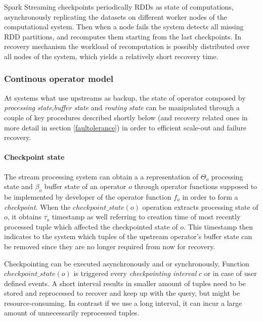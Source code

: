 Spark Streaming checkpoints periodically RDDs as state of computations, asynchronously replicating the datasets on different worker nodes of the computational system. Then when a node fails the system detects all missing RDD partitions, and recomputes them starting from the last checkpoints. In recovery mechanism the workload of recomputation is possibly distributed over all nodes of the system, which yields a relatively short recovery time.


\subsubsection{Continous operator model} %



At systems what use upstreams as backup, the state of operator composed by \textit{processing state},\textit{buffer state} and \textit{routing state} can be manipulated through a couple of key procedures described shortly below (and recovery related ones in more detail in section \ref{faultolerance}) in order to efficient scale-out and failure recovery.


\paragraph{Checkpoint state} 
The stream processing system can obtain a a representation of $\Theta_o$ processing state and $\beta_o$ buffer state of an operator $o$ through operator functions supposed to be implemented by developer of the operator function $f_o$ in order to form a \textit{checkpoint}. When the $checkpoint\_state(o)$ operation extracts processing state of $o$, it obtains $\overline{\tau_o}$ timestamp as well referring to creation time of most recently processed tuple which affected the checkpointed state of $o$. This timestamp then indicates to the system which tuples of the upstream  operator's buffer state can be removed since they are no longer required from now for recovery.

Checkpointing can be executed asynchronously and or synchronously. %
Function $checkpoint\_state(o)$ is triggered every \textit{checkpointing interval} $c$ or in case of user defined events. A short interval results in smaller amount of tuples need to be stored and reprocessed to recover and keep up with the query, but might be resource-consuming. In contrast if we use a long interval, it can incur a large amount of unnecessarily reprocessed tuples. 

